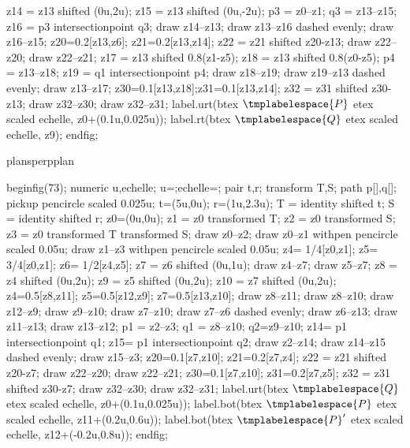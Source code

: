{{{\begin{mplibcode}[PfLAQ]
				z14 = z13 shifted (0u,2u);
				z15 = z13 shifted (0u,-2u);
				p3 = z0--z1;
				q3 = z13--z15;
				z16 = p3 intersectionpoint q3;
				draw z14--z13;
				draw z13--z16 dashed evenly;
				draw z16--z15;
				z20=0.2[z13,z6];
				z21=0.2[z13,z14];
				z22 = z21 shifted z20-z13;
				draw z22--z20;
				draw z22--z21;
				z17 = z13 shifted 0.8(z1-z5);
				z18 = z13 shifted 0.8(z0-z5);
				p4 = z13--z18;
				z19 = q1 intersectionpoint p4;
				draw z18--z19;
				draw z19--z13 dashed evenly;
				draw z13--z17;
				z30=0.1[z13,z18];z31=0.1[z13,z14];
				z32 = z31 shifted z30-z13;
				draw z32--z30;
				draw z32--z31;
				label.urt(btex $\tmplabelespace{P}$ etex scaled echelle, z0+(0.1u,0.025u));
				label.rt(btex $\tmplabelespace{Q}$ etex scaled echelle, z9);
				endfig;
			\end{mplibcode}
		}%
		{plansperpplan}{%
			\begin{mplibcode}[PfLAR]
				beginfig(73);
				numeric u,echelle;
				u=\scaleminischemspace*1cm;echelle=\scaleminischemspace;
				pair t,r;
				transform T,S;
				path p[],q[];
				pickup pencircle scaled 0.025u;
				t=(5u,0u); r=(1u,2.3u);
				T = identity shifted t;
				S = identity shifted r;
				z0=(0u,0u);
				z1 = z0 transformed T;
				z2 = z0 transformed S;
				z3 = z0 transformed T transformed S;
				draw z0--z2;
				draw z0--z1 withpen pencircle scaled 0.05u;
				draw z1--z3 withpen pencircle scaled 0.05u;
				z4= 1/4[z0,z1];
				z5= 3/4[z0,z1];
				z6= 1/2[z4,z5]; 
				z7 =  z6 shifted (0u,1u);
				draw z4--z7;
				draw z5--z7;
				z8 = z4 shifted (0u,2u);
				z9 = z5 shifted (0u,2u);
				z10 = z7 shifted (0u,2u);
				z4=0.5[z8,z11];
				z5=0.5[z12,z9];
				z7=0.5[z13,z10];
				draw z8--z11;
				draw z8--z10;
				draw z12--z9;
				draw z9--z10;
				draw z7--z10;
				draw z7--z6 dashed evenly;
				draw z6--z13;
				draw z11--z13;
				draw z13--z12;
				p1 = z2--z3;
				q1 = z8--z10;
				q2=z9--z10;
				z14= p1 intersectionpoint q1;
				z15= p1 intersectionpoint q2;
				draw z2--z14;
				draw z14--z15 dashed evenly;
				draw z15--z3;
				z20=0.1[z7,z10];
				z21=0.2[z7,z4];
				z22 = z21 shifted z20-z7;
				draw z22--z20;
				draw z22--z21;
				z30=0.1[z7,z10];
				z31=0.2[z7,z5];
				z32 = z31 shifted z30-z7;
				draw z32--z30;
				draw z32--z31;
				label.urt(btex $\tmplabelespace{Q}$ etex scaled echelle, z0+(0.1u,0.025u));
				label.bot(btex $\tmplabelespace{P}$ etex scaled echelle, z11+(0.2u,0.6u));
				label.bot(btex $\tmplabelespace{P}'$ etex scaled echelle, z12+(-0.2u,0.8u));
				endfig;
			\end{mplibcode}
}}}
